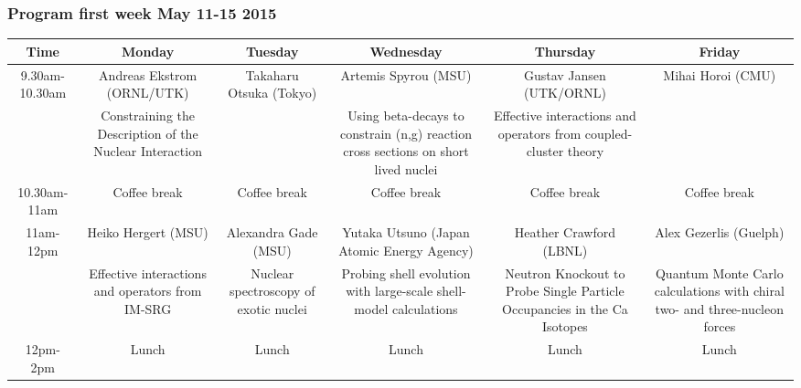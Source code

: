 \documentclass{beamer}
\begin{document}
\begin{frame}
\frametitle{Program first week May 11-15 2015}

\begin{block}{}


{\footnotesize
\begin{tabular}{cccccc}
\hline
\multicolumn{1}{c}{ Time } & \multicolumn{1}{c}{ Monday } & \multicolumn{1}{c}{ Tuesday } & \multicolumn{1}{c}{ Wednesday } & \multicolumn{1}{c}{ Thursday } & \multicolumn{1}{c}{ Friday } \\
\hline
9.30am-10.30am & Andreas Ekstrom (ORNL/UTK)                              & Takaharu Otsuka (Tokyo)               & Artemis Spyrou (MSU)                                                               & Gustav Jansen (UTK/ORNL)                                                 & Mihai Horoi (CMU)                                                          \\
               & Constraining the Description of the Nuclear Interaction &                                       & Using beta-decays to constrain (n,g) reaction cross sections on short lived nuclei & Effective interactions and operators from coupled-cluster theory         &                                                                            \\
\hline
10.30am-11am   & Coffee break                                            & Coffee break                          & Coffee break                                                                       & Coffee break                                                             & Coffee break                                                               \\
\hline
11am-12pm      & Heiko Hergert (MSU)                                     & Alexandra Gade (MSU)                  & Yutaka Utsuno (Japan Atomic Energy Agency)                                         & Heather Crawford (LBNL)                                                  & Alex Gezerlis (Guelph)                                                     \\
               & Effective interactions and operators from IM-SRG        & Nuclear spectroscopy of exotic nuclei & Probing shell evolution with large-scale shell-model calculations                  & Neutron Knockout to Probe Single Particle Occupancies in the Ca Isotopes & Quantum Monte Carlo calculations with chiral two- and three-nucleon forces \\
\hline
12pm-2pm       & Lunch                                                   & Lunch                                 & Lunch                                                                              & Lunch                                                                    & Lunch                                                                      \\

\end{tabular}}
\end{block}
\end{frame}
\end{document}
